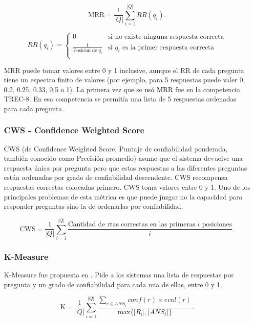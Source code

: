 \begin{equation}\label{eq:mrr}
 \text{MRR} = \frac{1}{|Q|} \sum_{i=1}^{|Q|} RR(q_i). \!
\end{equation}

\begin{equation*}
    RR(q_i) = \begin{cases}
               0     & \text{si no existe ninguna respuesta correcta}\\
               \frac{1}{\text{Posicion de }q_i} & \text{si }q_i\text{ es la primer respuesta correcta}\\
           \end{cases}
\end{equation*}

MRR puede tomar valores entre 0 y 1 inclusive, aunque el RR de cada pregunta tiene un espectro finito de valores (por ejemplo, para 5 respuestas puede valer 0, 0.2, 0.25, 0.33, 0.5 o 1). La primera vez que se usó MRR fue en la competencia TREC-8. En esa competencia se permitía una lista de 5 respuestas ordenadas para cada pregunta.


\subsubsection*{CWS - Confidence Weighted Score}
CWS (de Confidence Weighted Score, Puntaje de confiabilidad ponderada, también conocido como Precisión promedio) asume que el sistema devuelve una respuesta única por pregunta pero que estas respuestas a las diferentes preguntas están ordenadas por grado de confiabilidad descendente.
CWS recompensa respuestas correctas colocadas primero. CWS toma valores entre 0 y 1.  Uno de los principales problemas de esta métrica es que puede juzgar no la capacidad para responder preguntas sino la de ordenarlas por confiabilidad.

\begin{equation}\label{eq:cws}
 \text{CWS} = \frac{1}{|Q|} \sum_{i=1}^{|Q|} \frac{\text{Cantidad de rtas correctas en las primeras $i$ posiciones}}{i}. \!
\end{equation}


\subsubsection*{K-Measure}
K-Measure fue propuesta en \cite{CLEF04}. Pide a los sistemas una lista de respuestas por pregunta y un grado de confiabilidad para cada una de ellas, entre 0 y 1.

\begin{equation}\label{eq:k}
 \text{K} = \frac{1}{|Q|} \sum_{i=1}^{|Q|} \frac{\sum_{r \in ANS_i} conf(r) \times eval(r)}{\text{max}\{|R_i|, |ANS_i|\}}. \!
\end{equation}

